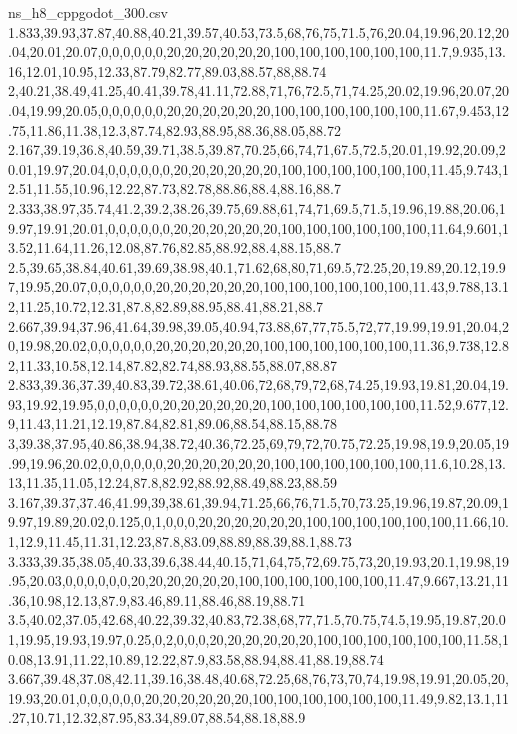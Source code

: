 \begin{filecontents*}[overwrite]{ns_h8_cppgodot_300.csv}
1.833,39.93,37.87,40.88,40.21,39.57,40.53,73.5,68,76,75,71.5,76,20.04,19.96,20.12,20.04,20.01,20.07,0,0,0,0,0,0,20,20,20,20,20,20,100,100,100,100,100,100,11.7,9.935,13.16,12.01,10.95,12.33,87.79,82.77,89.03,88.57,88,88.74
2,40.21,38.49,41.25,40.41,39.78,41.11,72.88,71,76,72.5,71,74.25,20.02,19.96,20.07,20.04,19.99,20.05,0,0,0,0,0,0,20,20,20,20,20,20,100,100,100,100,100,100,11.67,9.453,12.75,11.86,11.38,12.3,87.74,82.93,88.95,88.36,88.05,88.72
2.167,39.19,36.8,40.59,39.71,38.5,39.87,70.25,66,74,71,67.5,72.5,20.01,19.92,20.09,20.01,19.97,20.04,0,0,0,0,0,0,20,20,20,20,20,20,100,100,100,100,100,100,11.45,9.743,12.51,11.55,10.96,12.22,87.73,82.78,88.86,88.4,88.16,88.7
2.333,38.97,35.74,41.2,39.2,38.26,39.75,69.88,61,74,71,69.5,71.5,19.96,19.88,20.06,19.97,19.91,20.01,0,0,0,0,0,0,20,20,20,20,20,20,100,100,100,100,100,100,11.64,9.601,13.52,11.64,11.26,12.08,87.76,82.85,88.92,88.4,88.15,88.7
2.5,39.65,38.84,40.61,39.69,38.98,40.1,71.62,68,80,71,69.5,72.25,20,19.89,20.12,19.97,19.95,20.07,0,0,0,0,0,0,20,20,20,20,20,20,100,100,100,100,100,100,11.43,9.788,13.12,11.25,10.72,12.31,87.8,82.89,88.95,88.41,88.21,88.7
2.667,39.94,37.96,41.64,39.98,39.05,40.94,73.88,67,77,75.5,72,77,19.99,19.91,20.04,20,19.98,20.02,0,0,0,0,0,0,20,20,20,20,20,20,100,100,100,100,100,100,11.36,9.738,12.82,11.33,10.58,12.14,87.82,82.74,88.93,88.55,88.07,88.87
2.833,39.36,37.39,40.83,39.72,38.61,40.06,72,68,79,72,68,74.25,19.93,19.81,20.04,19.93,19.92,19.95,0,0,0,0,0,0,20,20,20,20,20,20,100,100,100,100,100,100,11.52,9.677,12.9,11.43,11.21,12.19,87.84,82.81,89.06,88.54,88.15,88.78
3,39.38,37.95,40.86,38.94,38.72,40.36,72.25,69,79,72,70.75,72.25,19.98,19.9,20.05,19.99,19.96,20.02,0,0,0,0,0,0,20,20,20,20,20,20,100,100,100,100,100,100,11.6,10.28,13.13,11.35,11.05,12.24,87.8,82.92,88.92,88.49,88.23,88.59
3.167,39.37,37.46,41.99,39,38.61,39.94,71.25,66,76,71.5,70,73.25,19.96,19.87,20.09,19.97,19.89,20.02,0.125,0,1,0,0,0,20,20,20,20,20,20,100,100,100,100,100,100,11.66,10.1,12.9,11.45,11.31,12.23,87.8,83.09,88.89,88.39,88.1,88.73
3.333,39.35,38.05,40.33,39.6,38.44,40.15,71,64,75,72,69.75,73,20,19.93,20.1,19.98,19.95,20.03,0,0,0,0,0,0,20,20,20,20,20,20,100,100,100,100,100,100,11.47,9.667,13.21,11.36,10.98,12.13,87.9,83.46,89.11,88.46,88.19,88.71
3.5,40.02,37.05,42.68,40.22,39.32,40.83,72.38,68,77,71.5,70.75,74.5,19.95,19.87,20.01,19.95,19.93,19.97,0.25,0,2,0,0,0,20,20,20,20,20,20,100,100,100,100,100,100,11.58,10.08,13.91,11.22,10.89,12.22,87.9,83.58,88.94,88.41,88.19,88.74
3.667,39.48,37.08,42.11,39.16,38.48,40.68,72.25,68,76,73,70,74,19.98,19.91,20.05,20,19.93,20.01,0,0,0,0,0,0,20,20,20,20,20,20,100,100,100,100,100,100,11.49,9.82,13.1,11.27,10.71,12.32,87.95,83.34,89.07,88.54,88.18,88.9

\end{filecontents*}
